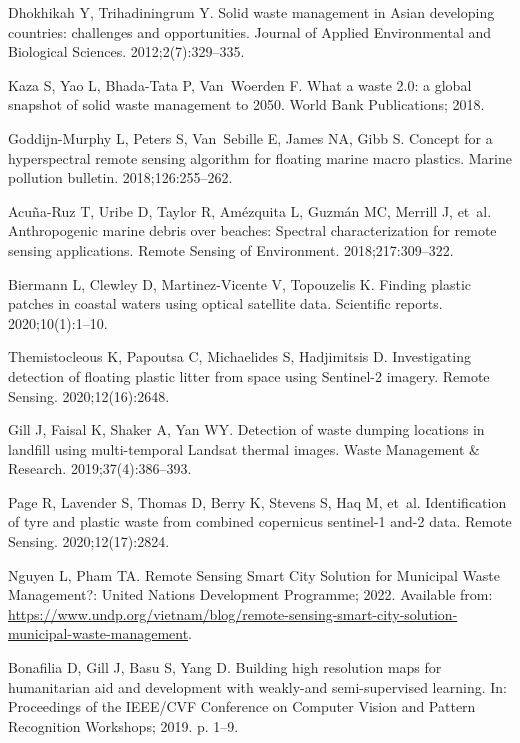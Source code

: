 \documentclass[10pt,letterpaper]{article}
\begin{document}
\begin{thebibliography}{10}
Dhokhikah Y, Trihadiningrum Y.
\newblock Solid waste management in Asian developing countries: challenges and
  opportunities.
\newblock Journal of Applied Environmental and Biological Sciences.
  2012;2(7):329--335.

Kaza S, Yao L, Bhada-Tata P, Van~Woerden F.
\newblock What a waste 2.0: a global snapshot of solid waste management to
  2050.
\newblock World Bank Publications; 2018.

Goddijn-Murphy L, Peters S, Van~Sebille E, James NA, Gibb S.
\newblock Concept for a hyperspectral remote sensing algorithm for floating
  marine macro plastics.
\newblock Marine pollution bulletin. 2018;126:255--262.

Acu{\~n}a-Ruz T, Uribe D, Taylor R, Am{\'e}zquita L, Guzm{\'a}n MC, Merrill J,
  et~al.
\newblock Anthropogenic marine debris over beaches: Spectral characterization
  for remote sensing applications.
\newblock Remote Sensing of Environment. 2018;217:309--322.

Biermann L, Clewley D, Martinez-Vicente V, Topouzelis K.
\newblock Finding plastic patches in coastal waters using optical satellite
  data.
\newblock Scientific reports. 2020;10(1):1--10.

Themistocleous K, Papoutsa C, Michaelides S, Hadjimitsis D.
\newblock Investigating detection of floating plastic litter from space using
  Sentinel-2 imagery.
\newblock Remote Sensing. 2020;12(16):2648.

Gill J, Faisal K, Shaker A, Yan WY.
\newblock Detection of waste dumping locations in landfill using multi-temporal
  Landsat thermal images.
\newblock Waste Management \& Research. 2019;37(4):386--393.

Page R, Lavender S, Thomas D, Berry K, Stevens S, Haq M, et~al.
\newblock Identification of tyre and plastic waste from combined copernicus
  sentinel-1 and-2 data.
\newblock Remote Sensing. 2020;12(17):2824.

Nguyen L, Pham TA. Remote Sensing Smart City Solution for Municipal Waste
  Management?: United Nations Development Programme; 2022.
\newblock Available from:
  \url{https://www.undp.org/vietnam/blog/remote-sensing-smart-city-solution-municipal-waste-management}.

Bonafilia D, Gill J, Basu S, Yang D.
\newblock Building high resolution maps for humanitarian aid and development
  with weakly-and semi-supervised learning.
\newblock In: Proceedings of the IEEE/CVF Conference on Computer Vision and
  Pattern Recognition Workshops; 2019. p. 1--9.


\end{thebibliography}
\end{document}
